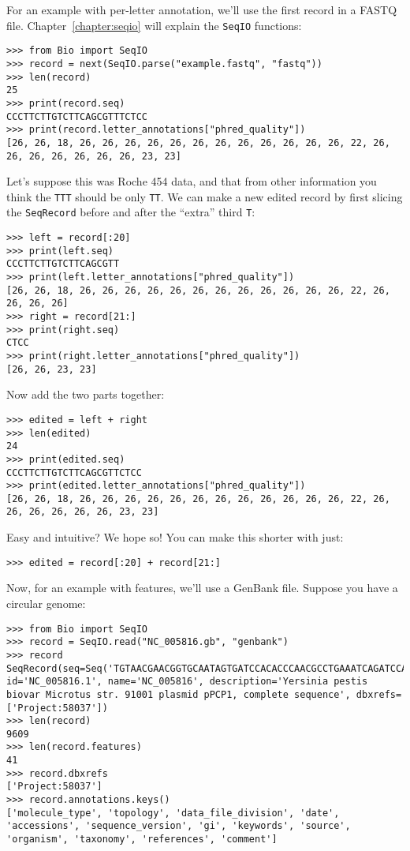 For an example with per-letter annotation, we'll use the first record in a
FASTQ file. Chapter~\ref{chapter:seqio} will explain the \verb|SeqIO| functions:

\begin{verbatim}
>>> from Bio import SeqIO
>>> record = next(SeqIO.parse("example.fastq", "fastq"))
>>> len(record)
25
>>> print(record.seq)
CCCTTCTTGTCTTCAGCGTTTCTCC
>>> print(record.letter_annotations["phred_quality"])
[26, 26, 18, 26, 26, 26, 26, 26, 26, 26, 26, 26, 26, 26, 26, 22, 26, 26, 26, 26, 26, 26, 26, 23, 23]
\end{verbatim}

\noindent Let's suppose this was Roche 454 data, and that from other information
you think the \texttt{TTT} should be only \texttt{TT}. We can make a new edited
record by first slicing the \verb|SeqRecord| before and after the ``extra''
third \texttt{T}:

\begin{verbatim}
>>> left = record[:20]
>>> print(left.seq)
CCCTTCTTGTCTTCAGCGTT
>>> print(left.letter_annotations["phred_quality"])
[26, 26, 18, 26, 26, 26, 26, 26, 26, 26, 26, 26, 26, 26, 26, 22, 26, 26, 26, 26]
>>> right = record[21:]
>>> print(right.seq)
CTCC
>>> print(right.letter_annotations["phred_quality"])
[26, 26, 23, 23]
\end{verbatim}

\noindent Now add the two parts together:

\begin{verbatim}
>>> edited = left + right
>>> len(edited)
24
>>> print(edited.seq)
CCCTTCTTGTCTTCAGCGTTCTCC
>>> print(edited.letter_annotations["phred_quality"])
[26, 26, 18, 26, 26, 26, 26, 26, 26, 26, 26, 26, 26, 26, 26, 22, 26, 26, 26, 26, 26, 26, 23, 23]
\end{verbatim}

\noindent Easy and intuitive? We hope so! You can make this shorter with just:

\begin{verbatim}
>>> edited = record[:20] + record[21:]
\end{verbatim}

Now, for an example with features, we'll use a GenBank file.
Suppose you have a circular genome:

\begin{verbatim}
>>> from Bio import SeqIO
>>> record = SeqIO.read("NC_005816.gb", "genbank")
>>> record
SeqRecord(seq=Seq('TGTAACGAACGGTGCAATAGTGATCCACACCCAACGCCTGAAATCAGATCCAGG...CTG'), id='NC_005816.1', name='NC_005816', description='Yersinia pestis biovar Microtus str. 91001 plasmid pPCP1, complete sequence', dbxrefs=['Project:58037'])
>>> len(record)
9609
>>> len(record.features)
41
>>> record.dbxrefs
['Project:58037']
>>> record.annotations.keys()
['molecule_type', 'topology', 'data_file_division', 'date', 'accessions', 'sequence_version', 'gi', 'keywords', 'source', 'organism', 'taxonomy', 'references', 'comment']
\end{verbatim}


